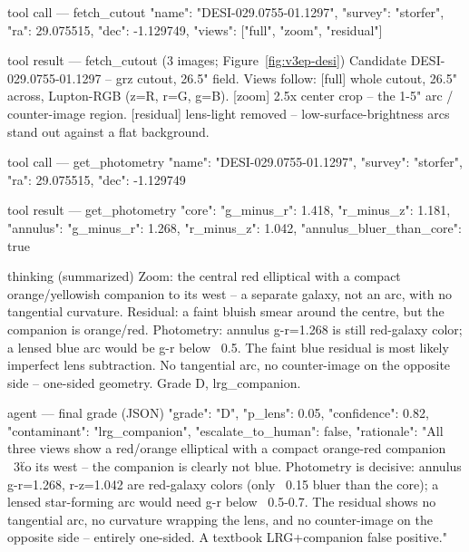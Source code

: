 \documentclass[11pt,letterpaper]{article}
\begin{document}
\begin{toolio}{tool call --- fetch\_cutout}
{"name": "DESI-029.0755-01.1297", "survey": "storfer", "ra": 29.075515, "dec": -1.129749, "views": ["full", "zoom", "residual"]}
\end{toolio}
\begin{toolio}{tool result --- fetch\_cutout (3 images; Figure~\ref{fig:v3ep-desi})}
Candidate DESI-029.0755-01.1297 -- grz cutout, 26.5" field. Views follow:
[full]     whole cutout, 26.5" across, Lupton-RGB (z=R, r=G, g=B).
[zoom]     2.5x center crop -- the 1-5" arc / counter-image region.
[residual] lens-light removed -- low-surface-brightness arcs stand out against a flat background.
\end{toolio}
\begin{toolio}{tool call --- get\_photometry}
{"name": "DESI-029.0755-01.1297", "survey": "storfer", "ra": 29.075515, "dec": -1.129749}
\end{toolio}
\begin{toolio}{tool result --- get\_photometry}
{"core": {"g_minus_r": 1.418, "r_minus_z": 1.181}, "annulus": {"g_minus_r": 1.268, "r_minus_z": 1.042}, "annulus_bluer_than_core": true}
\end{toolio}

\begin{toolio}{thinking (summarized)}
Zoom: the central red elliptical with a compact orange/yellowish companion to its west -- a separate
galaxy, not an arc, with no tangential curvature. Residual: a faint bluish smear around the centre,
but the companion is orange/red. Photometry: annulus g-r=1.268 is still red-galaxy color; a lensed
blue arc would be g-r below ~0.5. The faint blue residual is most likely imperfect lens subtraction.
No tangential arc, no counter-image on the opposite side -- one-sided geometry. Grade D, lrg_companion.
\end{toolio}

\begin{toolio}{agent --- final grade (JSON)}
{"grade": "D", "p_lens": 0.05, "confidence": 0.82, "contaminant": "lrg_companion",
 "escalate_to_human": false,
 "rationale": "All three views show a red/orange elliptical with a compact orange-red companion ~3\"
 to its west -- the companion is clearly not blue. Photometry is decisive: annulus g-r=1.268,
 r-z=1.042 are red-galaxy colors (only ~0.15 bluer than the core); a lensed star-forming arc would
 need g-r below ~0.5-0.7. The residual shows no tangential arc, no curvature wrapping the lens, and no
 counter-image on the opposite side -- entirely one-sided. A textbook LRG+companion false positive."}
\end{toolio}
\end{document}
